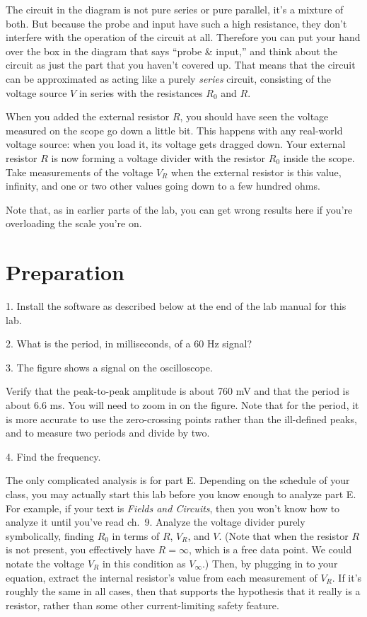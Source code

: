 
The circuit in the diagram is not pure series or pure parallel, it's a mixture of both.
But because the probe and input have such a high resistance, they don't interfere with
the operation of the circuit at all. Therefore you can put your hand over the box in
the diagram that says ``probe \& input,'' and think about the circuit as just the
part that you haven't covered up. That means that the circuit can be approximated as acting like a purely
\emph{series} circuit, consisting of the voltage source $V$ in series with the resistances
$R_0$ and $R$.

When you added the external resistor $R$, you should have seen the voltage measured on the scope go
down a little bit. This happens with any real-world voltage source: when you load it,
its voltage gets dragged down. Your external resistor $R$ is now forming a voltage divider
with the resistor $R_0$ inside the scope. Take measurements of the voltage $V_R$ when the external
resistor is this value, infinity, and one or two other values going down to a few hundred
ohms. 

Note that, as in earlier parts of the lab, you can get wrong results here if
you're overloading the scale you're on.


\section*{Preparation}

1. Install the software as described below at the end of the lab manual for this lab.

2. What is the period, in milliseconds, of a 60 Hz signal?

3. The figure shows a signal on the oscilloscope.


Verify that the peak-to-peak amplitude is about 760 mV and that the period is about
6.6 ms. You will need to zoom in on the figure. Note that for the period, it is
more accurate to use the zero-crossing points rather than the ill-defined peaks,
and to measure two periods and divide by two.

4. Find the frequency.

\analysis

The only complicated analysis is for part E. Depending on the schedule of your class,
you may actually start this lab before you know enough to analyze part E. For example, if
your text is \emph{Fields and Circuits}, then you won't know how to analyze it until
you've read ch.~9.
Analyze the voltage divider purely symbolically, finding
$R_0$ in terms of $R$, $V_R$, and $V$. (Note that when the resistor $R$ is not present,
you effectively have $R=\infty$, which is a free data point. We could notate the
voltage $V_R$ in this condition as $V_\infty$.)
Then, by plugging in to your equation, extract the internal resistor's value from each
measurement of $V_R$. If it's roughly the same in all cases, then that supports the hypothesis that it
really is a resistor, rather than some other current-limiting safety feature.

